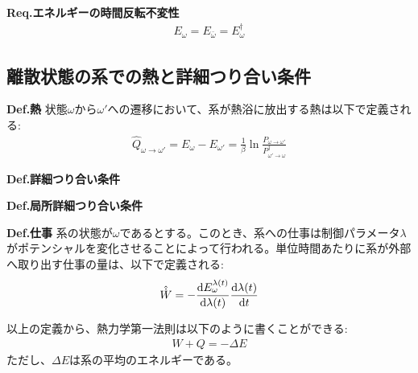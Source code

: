 \documentclass[a4paper,11pt]{jsarticle}
\numberwithin{equation}{section}
\begin{document}
\begin{itembox}[l]{\textbf{Req.エネルギーの時間反転不変性}}
    \begin{align}
        E_{\omega} = E_{\bar{\omega}} = E_{\omega}^{\dagger}
      \end{align}
\end{itembox}

\subsection{離散状態の系での熱と詳細つり合い条件}
\begin{itembox}[l]{\textbf{Def.熱}}
    状態$\omega$から$\omega'$への遷移において、系が熱浴に放出する熱は以下で定義される:
    \begin{align}
      \hat{Q}_{\omega \to \omega'} = E_{\omega} - E_{\omega'} = \frac{1}{\beta}\ln \frac{P_{\omega \to \omega'}}{P_{\omega' \to \omega}^{\dagger}}
    \end{align}
  \end{itembox}
  

\begin{itembox}[l]{\textbf{Def.詳細つり合い条件}}

\end{itembox}


\begin{itembox}[l]{\textbf{Def.局所詳細つり合い条件}}

\end{itembox}

  \begin{itembox}[l]{\textbf{Def.仕事}}
    系の状態が$\omega$であるとする。このとき、系への仕事は制御パラメータ$\lambda$がポテンシャルを変化させることによって行われる。単位時間あたりに系が外部へ取り出す仕事の量は、以下で定義される:
    \begin{align}
      \hat{\dot{W}} = -\dv{E^{\lambda(t)}_{\omega}}{\lambda(t)}\dv{\lambda(t)}{t}
    \end{align}
  \end{itembox}
  以上の定義から、熱力学第一法則は以下のように書くことができる:
  \begin{align}
    W + Q = -\Delta E
  \end{align}
  ただし、$\Delta E$は系の平均のエネルギーである。\\
\end{document}
